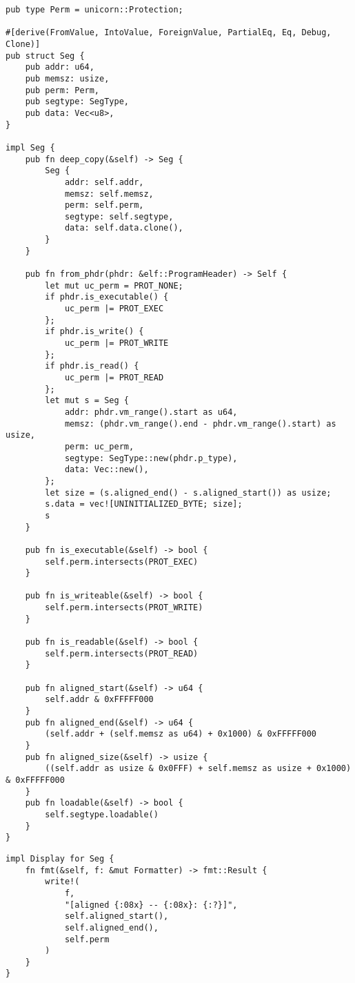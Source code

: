 \documentclass[11pt]{article}
\begin{document}
\lstset{language=rust,label=orgc072fdd,caption= ,captionpos=b,numbers=none}
\begin{lstlisting}
pub type Perm = unicorn::Protection;

#[derive(FromValue, IntoValue, ForeignValue, PartialEq, Eq, Debug, Clone)]
pub struct Seg {
    pub addr: u64,
    pub memsz: usize,
    pub perm: Perm,
    pub segtype: SegType,
    pub data: Vec<u8>,
}

impl Seg {
    pub fn deep_copy(&self) -> Seg {
        Seg {
            addr: self.addr,
            memsz: self.memsz,
            perm: self.perm,
            segtype: self.segtype,
            data: self.data.clone(),
        }
    }

    pub fn from_phdr(phdr: &elf::ProgramHeader) -> Self {
        let mut uc_perm = PROT_NONE;
        if phdr.is_executable() {
            uc_perm |= PROT_EXEC
        };
        if phdr.is_write() {
            uc_perm |= PROT_WRITE
        };
        if phdr.is_read() {
            uc_perm |= PROT_READ
        };
        let mut s = Seg {
            addr: phdr.vm_range().start as u64,
            memsz: (phdr.vm_range().end - phdr.vm_range().start) as usize,
            perm: uc_perm,
            segtype: SegType::new(phdr.p_type),
            data: Vec::new(),
        };
        let size = (s.aligned_end() - s.aligned_start()) as usize;
        s.data = vec![UNINITIALIZED_BYTE; size];
        s
    }

    pub fn is_executable(&self) -> bool {
        self.perm.intersects(PROT_EXEC)
    }

    pub fn is_writeable(&self) -> bool {
        self.perm.intersects(PROT_WRITE)
    }

    pub fn is_readable(&self) -> bool {
        self.perm.intersects(PROT_READ)
    }

    pub fn aligned_start(&self) -> u64 {
        self.addr & 0xFFFFF000
    }
    pub fn aligned_end(&self) -> u64 {
        (self.addr + (self.memsz as u64) + 0x1000) & 0xFFFFF000
    }
    pub fn aligned_size(&self) -> usize {
        ((self.addr as usize & 0x0FFF) + self.memsz as usize + 0x1000) & 0xFFFFF000
    }
    pub fn loadable(&self) -> bool {
        self.segtype.loadable()
    }
}
\end{lstlisting}

\lstset{language=rust,label=orgb3ed977,caption= ,captionpos=b,numbers=none}
\begin{lstlisting}
impl Display for Seg {
    fn fmt(&self, f: &mut Formatter) -> fmt::Result {
        write!(
            f,
            "[aligned {:08x} -- {:08x}: {:?}]",
            self.aligned_start(),
            self.aligned_end(),
            self.perm
        )
    }
}
\end{lstlisting}
\end{document}

